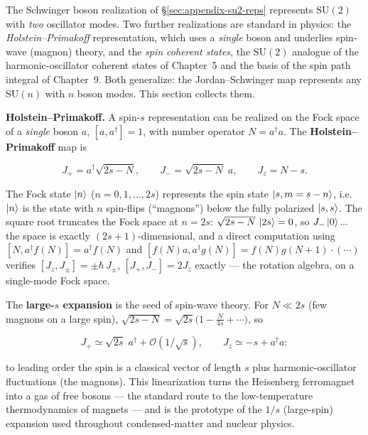 The Schwinger boson realization of \S\ref{sec:appendix-su2-reps} represents $\mathrm{SU}(2)$ with \emph{two} oscillator modes. Two further realizations are standard in physics: the \emph{Holstein--Primakoff} representation, which uses a \emph{single} boson and underlies spin-wave (magnon) theory, and the \emph{spin coherent states}, the $\mathrm{SU}(2)$ analogue of the harmonic-oscillator coherent states of Chapter~5 and the basis of the spin path integral of Chapter~9. Both generalize: the Jordan--Schwinger map represents any $\mathrm{SU}(n)$ with $n$ boson modes. This section collects them.

\medskip\noindent\textbf{Holstein--Primakoff.} A spin-$s$ representation can be realized on the Fock space of a \emph{single} boson $a$, $[a,a^{\dagger}]=1$, with number operator $N=a^{\dagger}a$. The \textbf{Holstein--Primakoff} map is
\begin{linenomath}
\begin{equation}
J_{+}=a^{\dagger}\sqrt{2s-N},\qquad
J_{-}=\sqrt{2s-N}\;a,\qquad
J_{z}=N-s.
\label{eq:holstein-primakoff}
\end{equation}
\end{linenomath}
The Fock state $\ket{n}$ ($n=0,1,\ldots,2s$) represents the spin state $\ket{s,m=s-n}$, i.e.\ $\ket{n}$ is the state with $n$ spin-flips (``magnons'') below the fully polarized $\ket{s,s}$. The square root truncates the Fock space at $n=2s$: $\sqrt{2s-N}\,\ket{2s}=0$, so $J_{-}\ket{0}... $ the space is exactly $(2s{+}1)$-dimensional, and a direct computation using $[N,a^{\dagger}f(N)]=a^{\dagger}f(N)$ and $[f(N)a,a^{\dagger}g(N)]=f(N)g(N{+}1)\cdot(\cdots)$ verifies $[J_{z},J_{\pm}]=\pm\hbar\,J_{\pm}$, $[J_{+},J_{-}]=2J_{z}$ exactly --- the rotation algebra, on a single-mode Fock space.

The \textbf{large-$s$ expansion} is the seed of spin-wave theory. For $N\ll 2s$ (few magnons on a large spin), $\sqrt{2s-N}=\sqrt{2s}\bigl(1-\frac{N}{4s}+\cdots\bigr)$, so
\begin{linenomath}
\begin{equation}
J_{+}\simeq\sqrt{2s}\;a^{\dagger}+\mathcal O(1/\sqrt{s}),\qquad J_{z}\simeq-s+a^{\dagger}a:
\label{eq:hp-large-s}
\end{equation}
\end{linenomath}
to leading order the spin is a classical vector of length $s$ plus harmonic-oscillator fluctuations (the magnons). This linearization turns the Heisenberg ferromagnet into a gas of free bosons --- the standard route to the low-temperature thermodynamics of magnets --- and is the prototype of the $1/s$ (large-spin) expansion used throughout condensed-matter and nuclear physics.


